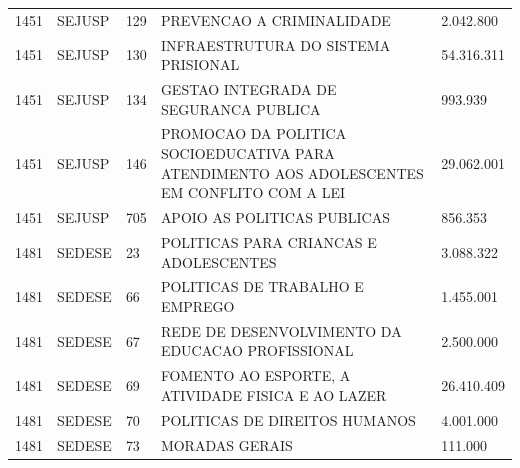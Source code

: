 \documentclass{article}
\begin{document}
\begin{longtable}[c]{m{1cm}|m{1.5cm}|m{1cm}m{10cm}|m{2cm}}
\multicolumn{1}{C{1cm}|}{1451} & \multicolumn{1}{L{1.5cm}|}{SEJUSP} & \multicolumn{1}{C{1cm}|}{129} & \multicolumn{1}{L{10cm}|}{PREVENCAO A CRIMINALIDADE} & \multicolumn{1}{R{2cm}}{2.042.800} \\
\multicolumn{1}{C{1cm}|}{1451} & \multicolumn{1}{L{1.5cm}|}{SEJUSP} & \multicolumn{1}{C{1cm}|}{130} & \multicolumn{1}{L{10cm}|}{INFRAESTRUTURA DO SISTEMA PRISIONAL} & \multicolumn{1}{R{2cm}}{54.316.311} \\
\multicolumn{1}{C{1cm}|}{1451} & \multicolumn{1}{L{1.5cm}|}{SEJUSP} & \multicolumn{1}{C{1cm}|}{134} & \multicolumn{1}{L{10cm}|}{GESTAO INTEGRADA DE SEGURANCA PUBLICA} & \multicolumn{1}{R{2cm}}{993.939} \\
\multicolumn{1}{C{1cm}|}{1451} & \multicolumn{1}{L{1.5cm}|}{SEJUSP} & \multicolumn{1}{C{1cm}|}{146} & \multicolumn{1}{L{10cm}|}{PROMOCAO DA POLITICA SOCIOEDUCATIVA PARA ATENDIMENTO AOS ADOLESCENTES EM CONFLITO COM A LEI} & \multicolumn{1}{R{2cm}}{29.062.001} \\
\multicolumn{1}{C{1cm}|}{1451} & \multicolumn{1}{L{1.5cm}|}{SEJUSP} & \multicolumn{1}{C{1cm}|}{705} & \multicolumn{1}{L{10cm}|}{APOIO AS POLITICAS PUBLICAS} & \multicolumn{1}{R{2cm}}{856.353} \\
\multicolumn{1}{C{1cm}|}{1481} & \multicolumn{1}{L{1.5cm}|}{SEDESE} & \multicolumn{1}{C{1cm}|}{23} & \multicolumn{1}{L{10cm}|}{POLITICAS PARA CRIANCAS E ADOLESCENTES} & \multicolumn{1}{R{2cm}}{3.088.322} \\
\multicolumn{1}{C{1cm}|}{1481} & \multicolumn{1}{L{1.5cm}|}{SEDESE} & \multicolumn{1}{C{1cm}|}{66} & \multicolumn{1}{L{10cm}|}{POLITICAS DE TRABALHO E EMPREGO} & \multicolumn{1}{R{2cm}}{1.455.001} \\
\multicolumn{1}{C{1cm}|}{1481} & \multicolumn{1}{L{1.5cm}|}{SEDESE} & \multicolumn{1}{C{1cm}|}{67} & \multicolumn{1}{L{10cm}|}{REDE DE DESENVOLVIMENTO DA EDUCACAO PROFISSIONAL} & \multicolumn{1}{R{2cm}}{2.500.000} \\
\multicolumn{1}{C{1cm}|}{1481} & \multicolumn{1}{L{1.5cm}|}{SEDESE} & \multicolumn{1}{C{1cm}|}{69} & \multicolumn{1}{L{10cm}|}{FOMENTO AO ESPORTE, A ATIVIDADE FISICA E AO LAZER} & \multicolumn{1}{R{2cm}}{26.410.409} \\
\multicolumn{1}{C{1cm}|}{1481} & \multicolumn{1}{L{1.5cm}|}{SEDESE} & \multicolumn{1}{C{1cm}|}{70} & \multicolumn{1}{L{10cm}|}{POLITICAS DE DIREITOS HUMANOS} & \multicolumn{1}{R{2cm}}{4.001.000} \\
\multicolumn{1}{C{1cm}|}{1481} & \multicolumn{1}{L{1.5cm}|}{SEDESE} & \multicolumn{1}{C{1cm}|}{73} & \multicolumn{1}{L{10cm}|}{MORADAS GERAIS} & \multicolumn{1}{R{2cm}}{111.000} \\

\end{longtable}
\end{document}
